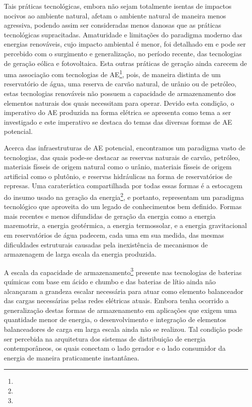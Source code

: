 \documentclass[
  12pt,       %
  openright,      %
  twoside,      %
  a4paper,      %
  english,      %
  french,       %
  spanish,      %
  brazil        %
  ]{abntex2}
\begin{document}
Tais práticas tecnológicas, embora não sejam totalmente isentas de impactos nocivos ao ambiente natural, afetam o ambiente natural de maneira menos agressiva, podendo assim ser consideradas menos danosas que as práticas tecnológicas supracitadas. Amaturidade e limitações do paradigma moderno das energias renováveis, cujo impacto ambiental é menor, foi detalhado em  e pode ser percebido com o surgimento e generalização, no período recente, das tecnologias de geração eólica e fotovoltaica. Esta outras práticas de geração ainda carecem de uma associação com tecnologias de AE\footnote{}, pois, de maneira distinta de um reservatório de água, uma reserva de carvão natural, de urânio ou de petróleo, estas tecnologias renováveis não possuem a capacidade de armazenamento dos elementos naturais dos quais necessitam para operar. Devido esta condição, o imperativo do AE produzida na forma elétrica se apresenta como tema a ser investigado e este imperativo se destaca do temas das diversas formas de AE potencial. 

Acerca das infraestruturas de AE potencial, encontramos um paradigma vasto de tecnologias, das quais pode-se destacar as reservas naturais de carvão, petróleo, materiais físseis de origem natural como o urânio, materiais físseis de origem artificial como o plutônio, e reservas hidráulicas na forma de reservatórios de represas. Uma caraterística compartilhada por todas essas formas é a estocagem do insumo usado na geração da energia\footnote{}, e portanto, representam um paradigma tecnológico que aproveita do um legado de conhecimentos bem definido. Formas mais recentes e menos difundidas de geração da energia como a energia maremotriz, a energia geotérmica, a energia termossolar, e a energia gravitacional em reservatórios de água padecem, cada uma em sua medida, das mesmas dificuldades estruturais causadas pela inexistência de mecanismos de armazenagem de larga escala da energia produzida.

A escala da capacidade de armazenamento\footnote{} presente nas tecnologias de baterias químicas com base em ácido e chumbo e das baterias de lítio ainda não alcançaram a grandeza escalar necessária para atuar como elemento balanceador das cargas necessárias pelas redes elétricas atuais. Embora tenha ocorrido a generalização destas formas de armazenamento em aplicações que exigem uma quantidade menor de energia, o desenvolvimento e integração de elementos balanceadores de carga em larga escala ainda não se realizou. Tal condição pode ser percebida na arquitetura dos sistemas de distribuição de energia contemporâneos, os quais conectam o lado gerador e o lado consumidor da energia de maneira praticamente instantânea.
\end{document}
